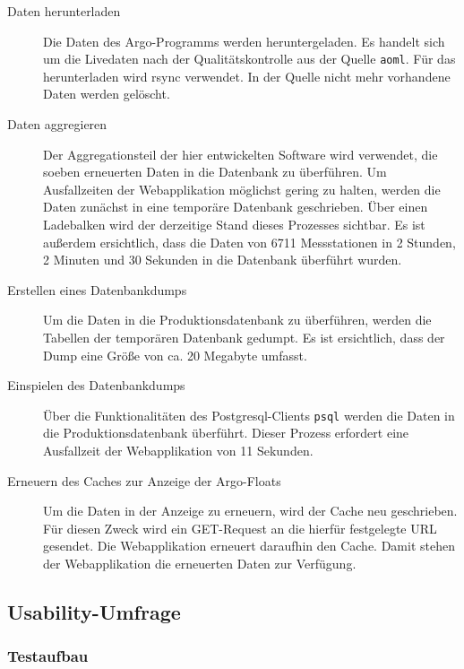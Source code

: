 \begin{description}
 \item [Daten herunterladen]
    Die Daten des Argo-Programms werden heruntergeladen. Es handelt sich um die Livedaten nach der Qualitätskontrolle aus der Quelle \texttt{aoml}. Für das herunterladen wird rsync verwendet. In der Quelle nicht mehr vorhandene Daten werden gelöscht.


 \item [Daten aggregieren]
    Der Aggregationsteil der hier entwickelten Software wird verwendet, die soeben erneuerten Daten in die Datenbank zu überführen. Um Ausfallzeiten der Webapplikation möglichst gering zu halten, werden die Daten zunächst in eine temporäre Datenbank geschrieben. Über einen Ladebalken wird der derzeitige Stand dieses Prozesses sichtbar. Es ist außerdem ersichtlich, dass die Daten von 6711 Messstationen in 2 Stunden, 2 Minuten und 30 Sekunden in die Datenbank überführt wurden.

 \item [Erstellen eines Datenbankdumps]
    Um die Daten in die Produktionsdatenbank zu überführen, werden die Tabellen der temporären Datenbank gedumpt. Es ist ersichtlich, dass der Dump eine Größe von  ca. 20 Megabyte umfasst.

 \item [Einspielen des Datenbankdumps]
    Über die Funktionalitäten des Postgresql-Clients \texttt{psql} werden die Daten in die Produktionsdatenbank überführt. Dieser Prozess erfordert eine Ausfallzeit der Webapplikation von 11 Sekunden.

 \item [Erneuern des Caches zur Anzeige der Argo-Floats]
    Um die Daten in der Anzeige zu erneuern, wird der Cache neu geschrieben. Für diesen Zweck wird ein GET-Request an die hierfür festgelegte URL gesendet. Die Webapplikation erneuert daraufhin den Cache. Damit stehen der Webapplikation die erneuerten  Daten zur Verfügung.
\end{description}



\newpage
\subsection{Usability-Umfrage}

\subsubsection{Testaufbau}

